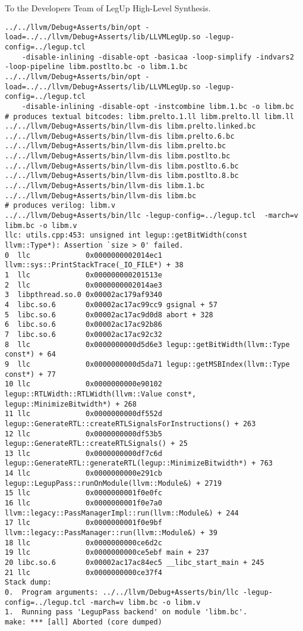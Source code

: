 \documentclass[11pt]{letter}
\begin{document}
\begin{letter}{To the Developers Team of LegUp High-Level Synthesis.}
{\begin{verbatim}
../../llvm/Debug+Asserts/bin/opt -load=../../llvm/Debug+Asserts/lib/LLVMLegUp.so -legup-config=../legup.tcl 
    -disable-inlining -disable-opt -basicaa -loop-simplify -indvars2  -loop-pipeline libm.postlto.bc -o libm.1.bc
../../llvm/Debug+Asserts/bin/opt -load=../../llvm/Debug+Asserts/lib/LLVMLegUp.so -legup-config=../legup.tcl 
    -disable-inlining -disable-opt -instcombine libm.1.bc -o libm.bc
# produces textual bitcodes: libm.prelto.1.ll libm.prelto.ll libm.ll
../../llvm/Debug+Asserts/bin/llvm-dis libm.prelto.linked.bc
../../llvm/Debug+Asserts/bin/llvm-dis libm.prelto.6.bc
../../llvm/Debug+Asserts/bin/llvm-dis libm.prelto.bc
../../llvm/Debug+Asserts/bin/llvm-dis libm.postlto.bc
../../llvm/Debug+Asserts/bin/llvm-dis libm.postlto.6.bc
../../llvm/Debug+Asserts/bin/llvm-dis libm.postlto.8.bc
../../llvm/Debug+Asserts/bin/llvm-dis libm.1.bc
../../llvm/Debug+Asserts/bin/llvm-dis libm.bc
# produces verilog: libm.v
../../llvm/Debug+Asserts/bin/llc -legup-config=../legup.tcl  -march=v libm.bc -o libm.v
llc: utils.cpp:453: unsigned int legup::getBitWidth(const llvm::Type*): Assertion `size > 0' failed.
0  llc             0x0000000002014ec1 llvm::sys::PrintStackTrace(_IO_FILE*) + 38
1  llc             0x000000000201513e
2  llc             0x0000000002014ae3
3  libpthread.so.0 0x00002ac179af9340
4  libc.so.6       0x00002ac17ac99cc9 gsignal + 57
5  libc.so.6       0x00002ac17ac9d0d8 abort + 328
6  libc.so.6       0x00002ac17ac92b86
7  libc.so.6       0x00002ac17ac92c32
8  llc             0x0000000000d5d6e3 legup::getBitWidth(llvm::Type const*) + 64
9  llc             0x0000000000d5da71 legup::getMSBIndex(llvm::Type const*) + 77
10 llc             0x0000000000e90102 legup::RTLWidth::RTLWidth(llvm::Value const*, legup::MinimizeBitwidth*) + 268
11 llc             0x0000000000df552d legup::GenerateRTL::createRTLSignalsForInstructions() + 263
12 llc             0x0000000000df53b5 legup::GenerateRTL::createRTLSignals() + 25
13 llc             0x0000000000df7c6d legup::GenerateRTL::generateRTL(legup::MinimizeBitwidth*) + 763
14 llc             0x0000000000e291cb legup::LegupPass::runOnModule(llvm::Module&) + 2719
15 llc             0x0000000001f0e0fc
16 llc             0x0000000001f0e7a0 llvm::legacy::PassManagerImpl::run(llvm::Module&) + 244
17 llc             0x0000000001f0e9bf llvm::legacy::PassManager::run(llvm::Module&) + 39
18 llc             0x0000000000ce6d2c
19 llc             0x0000000000ce5ebf main + 237
20 libc.so.6       0x00002ac17ac84ec5 __libc_start_main + 245
21 llc             0x0000000000ce37f4
Stack dump:
0.	Program arguments: ../../llvm/Debug+Asserts/bin/llc -legup-config=../legup.tcl -march=v libm.bc -o libm.v
1.	Running pass 'LegupPass backend' on module 'libm.bc'.
make: *** [all] Aborted (core dumped)
\end{verbatim}
}


\end{letter}
\end{document}
